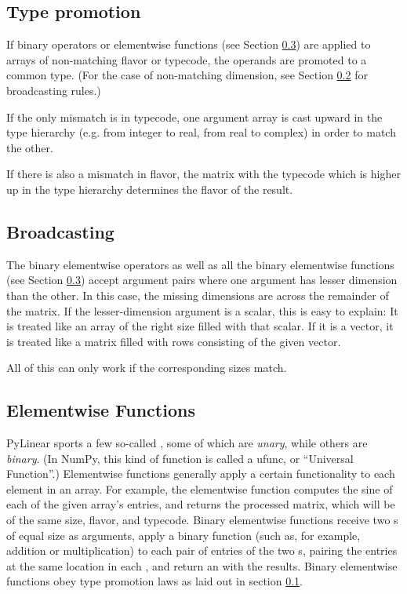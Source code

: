\subsection{Type promotion}
\label{subsec:arraypromotion}

If binary operators or elementwise functions (see Section
\ref{subsec:elementwise-funcs}) are applied to arrays of non-matching flavor or
typecode, the operands are promoted to a common type. (For the case of
non-matching dimension, see Section \ref{subsec:arraybroadcast} for
broadcasting rules.)

If the only mismatch is in typecode, one argument array
is cast upward in the type hierarchy (e.g. from integer to real,
from real to complex) in order to match the other.

If there is also a mismatch in flavor, the matrix with the typecode
which is higher up in the type hierarchy determines the flavor of the
result.

\subsection{Broadcasting}
\label{subsec:arraybroadcast}

The binary elementwise operators as well as all the binary elementwise
functions (see Section \ref{subsec:elementwise-funcs}) accept argument pairs
where one argument has lesser dimension than the other. In this case, the
missing dimensions are  across the remainder
of the matrix. If the lesser-dimension argument is a scalar, this is easy to
explain: It is treated like an array of the right size filled with that scalar.
If it is a vector, it is treated like a matrix filled with rows consisting of
the given vector.

All of this can only work if the corresponding  sizes 
match.

\subsection{Elementwise Functions}
\label{subsec:elementwise-funcs}

PyLinear sports a few so-called ,
 some of which are
\emph{unary}, while others are \emph{binary}. (In NumPy, this kind of function
is called a ufunc, or ``Universal Function''.) Elementwise functions generally
apply a certain functionality to each element in an array. For example, the
 elementwise function computes the sine of each of the given
array's entries, and returns the processed matrix, which will be of the same
size, flavor, and typecode. Binary elementwise functions receive two
s of equal size as arguments, apply a binary function (such as,
for example, addition or multiplication) to each pair of entries of the two
s, pairing the entries at the same location in each ,
and return an  with the results. Binary elementwise functions obey
type promotion laws as laid out in section \ref{subsec:arraypromotion}.

